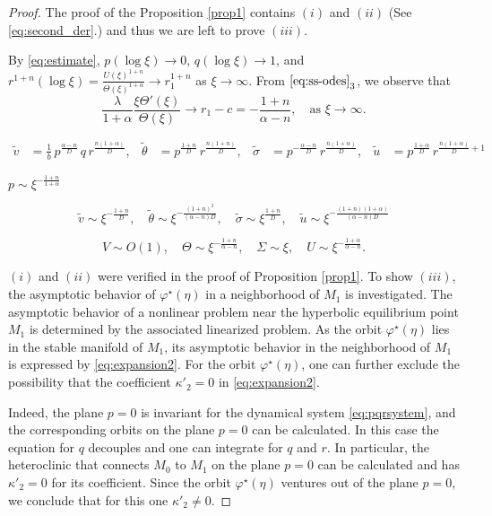 \documentclass[a4paper,11pt]{article}
\def\tv{{\tilde{v}}}
\def\tth{{\tilde{\theta}}}
\def\ts{{\tilde{\sigma}}}
\def\tu{{\tilde{u}}}
\begin{document}
\begin{proof}
The proof of the Proposition \ref{prop1} contains $(i)$ and $(ii)$ (See \eqref{eq:second_der}.) and thus we are left to prove $(iii)$. 

By \eqref{eq:estimate}, $p(\log\xi) \rightarrow 0$, $q(\log\xi) \rightarrow 1$, and $r^{1+n}(\log\xi)=\frac{U(\xi)^{1+n}}{\Theta(\xi)^{1+\alpha}} \rightarrow r_1^{1+n}$ as $\xi \rightarrow\infty$. From $\eqref{eq:ss-odes}_{3}$, we observe that
$$ \frac{\lambda}{1+\alpha} \frac{\xi\Theta'(\xi)}{\Theta(\xi)} \rightarrow r_1 - c = -\frac{1+n}{\alpha-n}, \quad \text{as $\xi \rightarrow \infty$}.$$



\begin{align*}
 \tv &= \frac{1}{b} \,p^{\frac{\alpha-n}{D}} \,q\, r^{\frac{n(1+\alpha)}{D}}, & \tth&=p^{\frac{1+n}{D}}\,r^{\frac{n(1+n)}{D}}, & \ts&=p^{-\frac{\alpha-n}{D}}\,r^{\frac{n(1+\alpha)}{D}}, & \tu&=p^{\frac{1+\alpha}{D}}\,r^{\frac{n(1+\alpha)}{D}+1}
\end{align*}

$p \sim \xi^{-\frac{1+n}{1+\alpha}}$

$$ \tv \sim \xi^{-\frac{1+n}{D}}, \quad \tth \sim \xi^{-\frac{(1+n)^2}{(\alpha-n)D}}, \quad \ts \sim \xi^{\frac{1+n}{D}}, \quad \tu \sim \xi^{-\frac{(1+n)(1+\alpha)}{(\alpha-n)D}}$$

$$ V \sim O(1), \quad \Theta \sim \xi^{-\frac{1+n}{\alpha-n}}, \quad \Sigma \sim \xi, \quad U \sim \xi^{-\frac{1+\alpha}{\alpha-n}}.$$


  $(i)$ and $(ii)$ were verified in the proof of Proposition \ref{prop1}. To show $(iii)$, the asymptotic behavior of $\varphi^\star(\eta)$ in a neighborhood of $M_1$ is investigated. The asymptotic behavior of a nonlinear problem near the hyperbolic equilibrium point $M_1$ is determined by the associated linearized problem. 
As the orbit $\varphi^\star(\eta)$ lies in the stable manifold of $M_1$,  its asymptotic behavior  in the neighborhood of $M_1$ is expressed by \eqref{eq:expansion2}. 
For the orbit $\varphi^\star(\eta)$, one can further exclude the possibility that the coefficient $\kappa'_2 = 0$ in \eqref{eq:expansion2}. 

Indeed,  the plane $p=0$ is invariant for the dynamical system \eqref{eq:pqrsystem}, and the corresponding orbits on the plane $p=0$ can be calculated. 
In this case  the equation for $q$ decouples and one can integrate for $q$ and $r$. 
In particular, the heteroclinic that connects $M_0$ to $M_1$ on the plane $p =0$  can be calculated and has  $\kappa'_2 = 0$ for its coefficient. 
Since the orbit $\varphi^\star(\eta)$ ventures out of the plane $p=0$, we conclude that for this one $\kappa'_2\ne0$. 


\end{proof}
\end{document}
